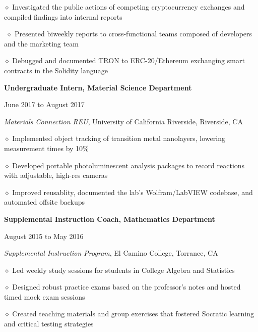 \documentclass [11pt]{article}
\begin{document}
\begin{flushleft}
‭‭\quad\quad\quad$\diamond$ Investigated the public actions of competing cryptocurrency exchanges and compiled findings into internal reports

‭‭%
\quad\quad\quad$\diamond$ Presented biweekly reports to cross-functional teams composed of developers and the marketing team

‭‭\quad\quad\quad$\diamond$ Debugged and documented TRON to ERC-20/Ethereum exchanging smart contracts in the Solidity language

\linebreak
\textbf{Undergraduate Intern, Material Science Department}\begin{minipage}{0.535 \linewidth}\begin{flushright}June 2017 to August 2017\end{flushright}\end{minipage}
\emph{Materials Connection REU}, University of California Riverside, Riverside, CA

‭‭\quad\quad\quad$\diamond$ ‭Implemented object tracking of transition metal nanolayers, lowering measurement times by 10$\%$

‭‭\quad\quad\quad$\diamond$ Developed portable photoluminescent analysis packages to record reactions with adjustable, high-res cameras

‭‭\quad\quad\quad$\diamond$ Improved reusablity, documented the lab’s Wolfram/LabVIEW codebase, and automated offsite backups

\linebreak
\textbf{Supplemental Instruction Coach, Mathematics Department}\begin{minipage}{0.475 \linewidth}\begin{flushright}August 2015 to May 2016\end{flushright}\end{minipage}
\emph{Supplemental Instruction Program}, El Camino College, Torrance, CA

‭‭\quad\quad\quad$\diamond$ ‭Led weekly study sessions for students in College Algebra and Statistics

‭‭\quad\quad\quad$\diamond$ Designed robust practice exams based on the professor's notes and hosted timed mock exam sessions

‭‭\quad\quad\quad$\diamond$ Created teaching materials and group exercises that fostered Socratic learning and critical testing strategies


\end{flushleft}
\end{document}
